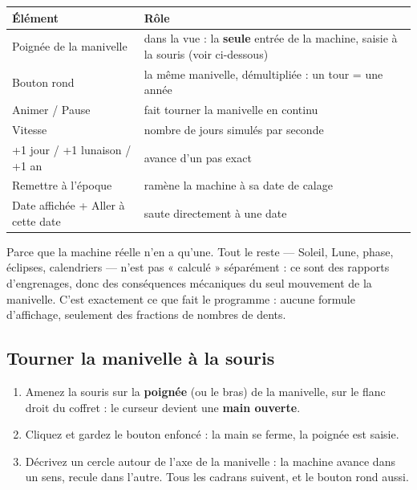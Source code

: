 \begin{center}
\begin{tabularx}{\textwidth}{@{}lX@{}}
\toprule
\rowcolor{lightblue}\textbf{Élément} & \textbf{Rôle} \\
\midrule
Poignée de la manivelle & dans la vue : la \textbf{seule} entrée de la machine, saisie à la
souris (voir ci-dessous) \\
Bouton rond & la même manivelle, démultipliée : un tour = une année \\
Animer / Pause & fait tourner la manivelle en continu \\
Vitesse & nombre de jours simulés par seconde \\
+1 jour / +1 lunaison / +1 an & avance d'un pas exact \\
Remettre à l'époque & ramène la machine à sa date de calage \\
Date affichée + Aller à cette date & saute directement à une date \\
\bottomrule
\end{tabularx}
\end{center}

\begin{info}
Parce que la machine réelle n'en a qu'une. Tout le reste — Soleil, Lune, phase, éclipses,
calendriers — n'est pas « calculé » séparément : ce sont des rapports d'engrenages, donc des
conséquences mécaniques du seul mouvement de la manivelle. C'est exactement ce que fait le
programme : aucune formule d'affichage, seulement des fractions de nombres de dents.
\end{info}

\subsection{Tourner la manivelle à la souris}


\begin{enumerate}
  \item Amenez la souris sur la \textbf{poignée} (ou le bras) de la manivelle, sur le flanc
        droit du coffret : le curseur devient une \textbf{main ouverte}.
  \item Cliquez et gardez le bouton enfoncé : la main se ferme, la poignée est saisie.
  \item Décrivez un cercle autour de l'axe de la manivelle : la machine avance dans un sens,
        recule dans l'autre. Tous les cadrans suivent, et le bouton rond aussi.
\end{enumerate}

